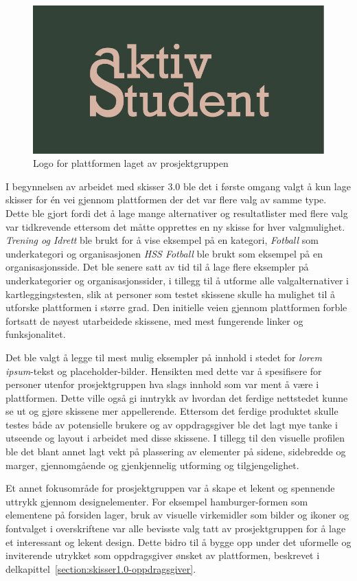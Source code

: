 \begin{figure}[H]
\centering
\includegraphics[width=.7\textwidth]{Illustrasjoner/aktivstudentlogo.png}
\caption{Logo for plattformen laget av prosjektgruppen}
\label{fig:aktivStudentLogo}
\end{figure}

I begynnelsen av arbeidet med skisser 3.0 ble det i første omgang valgt å kun lage skisser for én vei gjennom plattformen der det var flere valg av samme type. Dette ble gjort fordi det å lage mange alternativer og resultatlister med flere valg var tidkrevende ettersom det måtte opprettes en ny skisse for hver valgmulighet. {\em Trening og Idrett} ble brukt for å vise eksempel på en kategori, {\em Fotball} som underkategori og organisasjonen {\em HSS Fotball} ble brukt som eksempel på en organisasjonsside. Det ble senere satt av tid til å lage flere eksempler på underkategorier og organisasjonssider, i tillegg til å utforme alle valgalternativer i kartleggingstesten, slik at personer som testet skissene skulle ha mulighet til å utforske plattformen i større grad. Den initielle veien gjennom plattformen forble fortsatt de nøyest utarbeidede skissene, med mest fungerende linker og funksjonalitet.

Det ble valgt å legge til mest mulig eksempler på innhold i stedet for {\em lorem ipsum}-tekst og placeholder-bilder. Hensikten med dette var å spesifisere for personer utenfor prosjektgruppen hva slags innhold som var ment å være i plattformen. Dette ville også gi inntrykk av hvordan det ferdige nettstedet kunne se ut og gjøre skissene mer appellerende. Ettersom det ferdige produktet skulle testes både av potensielle brukere og av oppdragsgiver ble det lagt mye tanke i utseende og layout i arbeidet med disse skissene. I tillegg til den visuelle profilen ble det blant annet lagt vekt på plassering av elementer på sidene, sidebredde og marger, gjennomgående og gjenkjennelig utforming og tilgjengelighet. 

Et annet fokusområde for prosjektgruppen var å skape et lekent og spennende uttrykk gjennom designelementer. For eksempel hamburger-formen som elementene på forsiden lager, bruk av visuelle virkemidler som bilder og ikoner og fontvalget i overskriftene var alle bevisste valg tatt av prosjektgruppen for å lage et interessant og lekent design. Dette bidro til å bygge opp under det uformelle og inviterende utrykket som oppdragsgiver ønsket av plattformen, beskrevet i delkapittel~\ref{section:skisser1.0-oppdragsgiver}.


